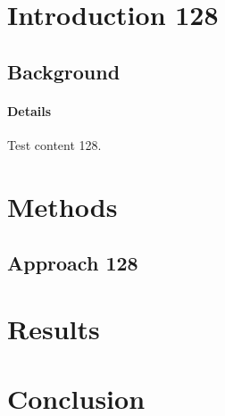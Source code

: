\documentclass{article}
\begin{document}
\section{Introduction 128}
\subsection{Background}
\paragraph{Details} Test content 128.
\section{Methods}
\subsection{Approach 128}
\section{Results}
\section{Conclusion}
\end{document}
